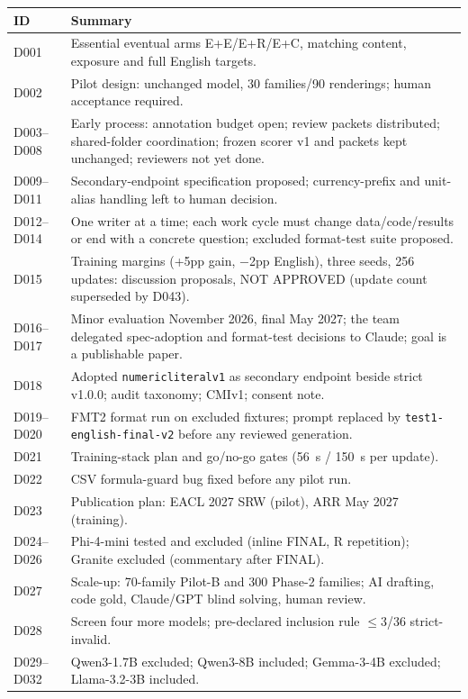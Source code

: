 \documentclass[12pt,a4paper,oneside]{report}
\renewcommand{\_}{\oldunderscore\allowbreak}
\begin{document}
\begin{longtable}{@{}p{1.2cm}p{12.3cm}@{}}
\toprule
ID & Summary\\
\midrule
\endhead
D001 & Essential eventual arms E+E/E+R/E+C, matching content, exposure and full English targets.\\
D002 & Pilot design: unchanged model, 30 families/90 renderings; human acceptance required.\\
D003--D008 & Early process: annotation budget open; review packets distributed; shared-folder coordination; frozen scorer v1 and packets kept unchanged; reviewers not yet done.\\
D009--D011 & Secondary-endpoint specification proposed; currency-prefix and unit-alias handling left to human decision.\\
D012--D014 & One writer at a time; each work cycle must change data/code/results or end with a concrete question; excluded format-test suite proposed.\\
D015 & Training margins (+5pp gain, $-$2pp English), three seeds, 256 updates: discussion proposals, NOT APPROVED (update count superseded by D043).\\
D016--D017 & Minor evaluation November 2026, final May 2027; the team delegated spec-adoption and format-test decisions to Claude; goal is a publishable paper.\\
D018 & Adopted \texttt{numeric\_literal\_v1} as secondary endpoint beside strict v1.0.0; audit taxonomy; CMI\_v1; consent note.\\
D019--D020 & FMT2 format run on excluded fixtures; prompt replaced by \texttt{test1-english-final-v2} before any reviewed generation.\\
D021 & Training-stack plan and go/no-go gates (56~s / 150~s per update).\\
D022 & CSV formula-guard bug fixed before any pilot run.\\
D023 & Publication plan: EACL 2027 SRW (pilot), ARR May 2027 (training).\\
D024--D026 & Phi-4-mini tested and excluded (inline FINAL, R repetition); Granite excluded (commentary after FINAL).\\
D027 & Scale-up: 70-family Pilot-B and 300 Phase-2 families; AI drafting, code gold, Claude/GPT blind solving, human review.\\
D028 & Screen four more models; pre-declared inclusion rule $\le$3/36 strict-invalid.\\
D029--D032 & Qwen3-1.7B excluded; Qwen3-8B included; Gemma-3-4B excluded; Llama-3.2-3B included.\\

\end{longtable}
\end{document}
